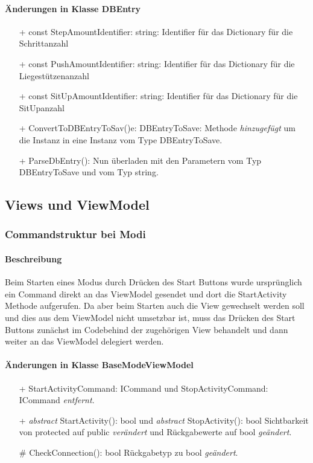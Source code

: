 \documentclass[a4paper,12pt]{article}
\begin{document}
\paragraph{Änderungen in Klasse DBEntry}

\begin{itemize}
	\item[+] const StepAmountIdentifier: string: Identifier für das Dictionary für die Schrittanzahl
	\item[+] const PushAmountIdentifier: string: Identifier für das Dictionary für die Liegestützenanzahl
	\item[+] const SitUpAmountIdentifier: string: Identifier für das Dictionary für die SitUpanzahl
	\item[+] ConvertToDBEntryToSav()e: DBEntryToSave: Methode \textit{hinzugefügt} um die Instanz in eine Instanz vom Type DBEntryToSave. 
	\item[+] ParseDbEntry(): Nun überladen mit den Parametern vom Typ DBEntryToSave und vom Typ string.
	
\end{itemize}

\subsection{Views und ViewModel}

\subsubsection{Commandstruktur bei Modi}
\paragraph{Beschreibung}
Beim Starten eines Modus durch Drücken des Start Buttons wurde ursprünglich ein Command direkt an das ViewModel gesendet und dort die StartActivity Methode aufgerufen. Da aber beim Starten auch die View gewechselt werden soll und dies aus dem ViewModel nicht umsetzbar ist, muss das Drücken des Start Buttons zunächst im Codebehind der zugehörigen View behandelt und dann weiter an das ViewModel delegiert werden. 
\paragraph{Änderungen in Klasse BaseModeViewModel}
\begin{itemize}
	\item[+] StartActivityCommand: ICommand und StopActivityCommand: ICommand \textit{entfernt}.
	\item[+] \textit{abstract} StartActivity(): bool und \textit{abstract} StopActivity(): bool Sichtbarkeit von protected auf public \textit{verändert} und Rückgabewerte auf bool \textit{geändert}.
	\item[\#] CheckConnection(): bool Rückgabetyp zu bool \textit{geändert}.
\end{itemize}
\end{document}
